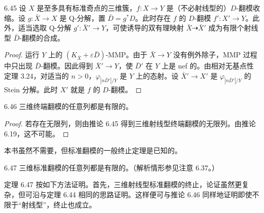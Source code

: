 \begin{corollaryp}{6.45}
设 $X$ 是至多具有标准奇点的三维簇，$f:X\to Y$ 是（不必射线型的）$D$-翻模收缩。设 $g:\bar X\to X$ 是 Q-分解，置 $\bar D=g^*D$。此时存在 $f$ 的 $D$-翻模 $f':X'\to Y$。此外，适当选取 Q-分解 $g':\bar X'\to Y$，可使诱导的双有理映射 $\bar X\dashrightarrow\bar X'$ 成为有限个射线型 $\bar D$-翻模的合成。
\end{corollaryp}

\begin{proof}
运行 $Y$ 上的 $(K_{\bar X}+\varepsilon\bar D)$-MMP。由于 $\bar X\to Y$ 没有例外除子，MMP 过程中只出现 $\bar D$-翻模。因此得到 $\bar X'\to Y$，使 $\bar D'$ 在 $Y$ 上是 nef 的。由相对无基点性定理 3.24，对适当的 $n>0$，$\varphi_{|n\bar D'|/Y}$ 是 $Y$ 上的态射。设 $\bar X'\to X'$ 是 $\varphi_{|n\bar D'|/Y}$ 的 Stein 分解。此时 $X'$ 就是 $f$ 的 $D$-翻模。
\end{proof}

\begin{corollaryp}[三维终端翻模的终止]{6.46}
三维终端翻模的任意列都是有限的。
\end{corollaryp}

\begin{proof}
若存在无限列，则由推论 6.45 得到三维射线型终端翻模的无限列。由推论 6.19，这不可能。
\end{proof}



本书虽然不需要，但标准翻模的一般终止定理是已知的。

\begin{theorem*}[三维标准翻模的终止 {[Kol89]}]{6.47}
三维标准翻模的任意列都是有限的。（解析情形参见注意 6.37。）
\end{theorem*}

定理 6.47 按如下方法证明。首先，三维射线型标准翻模的终止，论证虽然更复杂，但可沿与定理 6.44 相同的思路证明。这样便可与推论 6.46 同样地证明即使不限于“射线型”，终止也成立。

